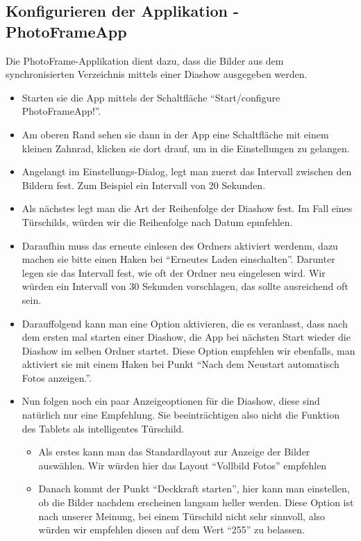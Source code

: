 \begin{flushleft}
  \subsection{Konfigurieren der Applikation - PhotoFrameApp}
  	Die PhotoFrame-Applikation dient dazu, dass die Bilder aus dem synchronisierten Verzeichnis mittels einer Diashow ausgegeben werden.
    \begin{itemize}
      \item Starten sie die App mittels der Schaltfläche ``Start/configure PhotoFrameApp!''.
      \item Am oberen Rand sehen sie dann in der App eine Schaltfläche mit einem kleinen Zahnrad, klicken sie dort drauf, um in die Einstellungen zu gelangen.
      \item Angelangt im Einstellungs-Dialog, legt man zuerst das Intervall zwischen den Bildern fest. Zum Beispiel ein Intervall von 20 Sekunden.
      \item Als nächstes legt man die Art der Reihenfolge der Diashow fest. Im Fall eines Türschilds, würden wir die Reihenfolge nach Datum epmfehlen.
      \item Daraufhin muss das erneute einlesen des Ordners aktiviert werdenm, dazu machen sie bitte einen Haken bei ``Erneutes Laden einschalten''. Darunter legen sie das Intervall fest, wie oft der Ordner neu eingelesen wird. Wir würden ein Intervall von 30 Sekunden vorschlagen, das sollte ausreichend oft sein.
      \item Darauffolgend kann man eine Option aktivieren, die es veranlasst, dass nach dem ersten mal starten einer Diashow, die App bei nächsten Start wieder die Diashow im selben Ordner startet. Diese Option empfehlen wir ebenfalls, man aktiviert sie mit einem Haken bei Punkt ``Nach dem Neustart automatisch Fotos anzeigen.''.
      \item Nun folgen noch ein paar Anzeigeoptionen für die Diashow, diese sind natürlich nur eine Empfehlung. Sie beeinträchtigen also nicht die Funktion des Tablets als intelligentes Türschild.
      \begin{itemize}
        \item Als erstes kann man das Standardlayout zur Anzeige der Bilder auswählen. Wir würden hier das Layout ``Vollbild Fotos'' empfehlen
        \item Danach kommt der Punkt ``Deckkraft starten'', hier kann man einstellen, ob die Bilder nachdem erscheinen langsam heller werden. Diese Option ist nach unserer Meinung, bei einem Türschild nicht sehr sinnvoll, also würden wir empfehlen diesen auf dem Wert ``255'' zu belassen.

\end{itemize}
\end{itemize}
\end{flushleft}

